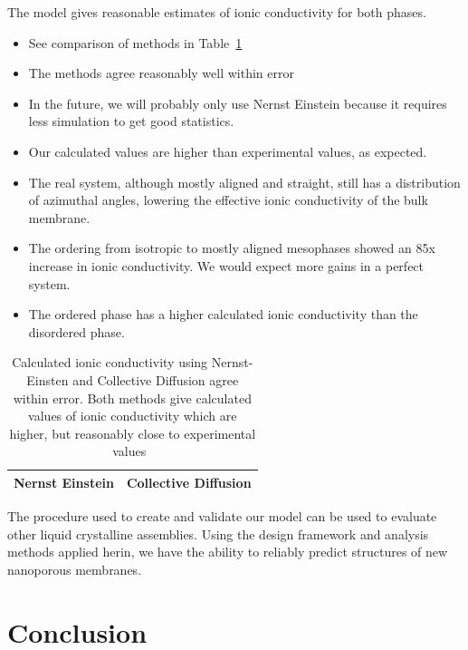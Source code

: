 \documentclass{article}
\begin{document}
	The model gives reasonable estimates of ionic conductivity for both phases.
	\begin{itemize}
		\item See comparison of methods in Table~\ref{table:conductivity}
		\item The methods agree reasonably well within error
		\item In the future, we will probably only use Nernst Einstein because it requires less simulation to get good statistics. %
		\item Our calculated values are higher than experimental values, as expected.
		\item The real system, although mostly aligned and straight, still has a distribution of azimuthal angles, lowering the effective ionic conductivity of the bulk membrane. 
		\item The ordering from isotropic to mostly aligned mesophases showed an 85x increase in ionic conductivity. We would expect more gains in a perfect system.
		\item The ordered phase has a higher calculated ionic conductivity than the disordered phase.
	\end{itemize}
	
	\begin{table}
	\centering
	\begin{tabular}{|c|c|}
	\hline
	Nernst Einstein & Collective Diffusion \\
	\hline
	\end{tabular}
	\caption{Calculated ionic conductivity using Nernst-Einsten and Collective Diffusion agree within error. Both methods give calculated values of ionic conductivity which are higher, but reasonably close to experimental values~\label{table:conductivity}}
	\end{table}

	The procedure used to create and validate our model can be used to evaluate other liquid crystalline assemblies. Using the design framework and analysis methods applied herin, we have the ability to reliably predict structures of new nanoporous membranes.

	\section{Conclusion}
	
\end{document}
